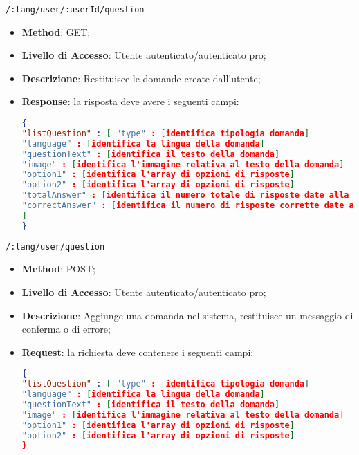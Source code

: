 \item \texttt{/:lang/user/:userId/question}
	\begin{itemize}
		\item \textbf{Method}: GET;
		\item \textbf{Livello di Accesso}: Utente autenticato/autenticato pro;
		\item \textbf{Descrizione}: Restituisce le domande create dall'utente;
		\item \textbf{Response}: la risposta deve avere i seguenti campi:
\begin{lstlisting}[language=json,firstnumber=1]
{
"listQuestion" : [ "type" : [identifica tipologia domanda]
"language" : [identifica la lingua della domanda]
"questionText" : [identifica il testo della domanda]
"image" : [identifica l'immagine relativa al testo della domanda]
"option1" : [identifica l'array di opzioni di risposte]
"option2" : [identifica l'array di opzioni di risposte]
"totalAnswer" : [identifica il numero totale di risposte date alla domanda]
"correctAnswer" : [identifica il numero di risposte corrette date alla domanda]
]
}
\end{lstlisting}
	\end{itemize}	
	
	
	\item \texttt{/:lang/user/question}
		\begin{itemize}
			\item \textbf{Method}: POST;
			\item \textbf{Livello di Accesso}: Utente autenticato/autenticato pro;
			\item \textbf{Descrizione}: Aggiunge una domanda nel sistema, restituisce un messaggio di conferma o di errore;
			\item \textbf{Request}: la richiesta deve contenere i seguenti campi:
\begin{lstlisting}[language=json,firstnumber=1]
{
"listQuestion" : [ "type" : [identifica tipologia domanda]
"language" : [identifica la lingua della domanda]
"questionText" : [identifica il testo della domanda]
"image" : [identifica l'immagine relativa al testo della domanda]
"option1" : [identifica l'array di opzioni di risposte]
"option2" : [identifica l'array di opzioni di risposte]
}
\end{lstlisting}
		\end{itemize}